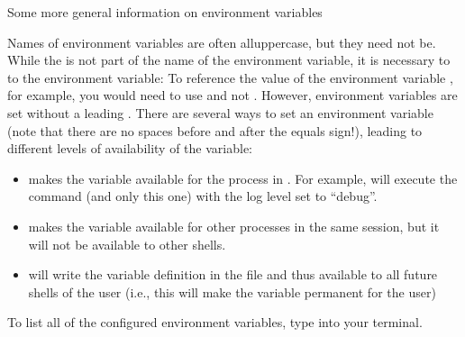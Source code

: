 \ignorespaces \begin{findoutmore}[label={fom-envvar}, before title={\thetcbcounter\ }, float, floatplacement=tb, check odd page=true]{Some more general information on environment variables}
\label{\detokenize{basics/101-123-config2:fom-envvar}}

\sphinxAtStartPar
Names of environment variables are often all\sphinxhyphen{}uppercase, but they need not be.
While the \sphinxcode{\sphinxupquote{\$}} is not part of
the name of the environment variable, it is necessary to  to the environment
variable: To reference the value of the environment variable , for example, you would
need to use  and not . However, environment variables are
set without a leading \sphinxcode{\sphinxupquote{\$}}. There are several ways to set an environment variable
(note that there are no spaces before and after the equals sign!), leading to different
levels of availability of the variable:
\begin{itemize}
\item {} 
\sphinxAtStartPar
{} makes the variable  available for the process in .
For example,  will execute the 
command (and only this one) with the log level set to “debug”.

\item {} 
\sphinxAtStartPar
{} makes the variable  available for other processes in the
same session, but it will not be available to other shells.

\item {} 
\sphinxAtStartPar
{} will write the variable definition in the
 file and thus available to all future shells of the user (i.e., this will make
the variable permanent for the user)

\end{itemize}

\sphinxAtStartPar
To list all of the configured environment variables, type  into your terminal.


\end{findoutmore}


